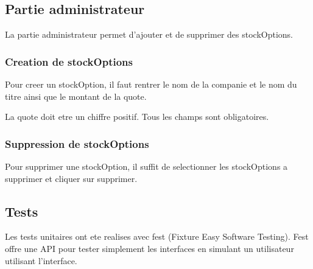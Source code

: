\subsection{Partie administrateur}
La partie administrateur permet d'ajouter et de supprimer des stockOptions.
\subsubsection{Creation de stockOptions}
Pour creer un stockOption, il faut rentrer le nom de la companie et le nom du titre ainsi que le montant de la quote.

La quote doit etre un chiffre positif. Tous les champs sont obligatoires.
\subsubsection{Suppression de stockOptions}
Pour supprimer une stockOption, il suffit de selectionner les stockOptions a supprimer et cliquer sur supprimer.
\subsection{Tests}
Les tests unitaires ont ete realises avec fest (Fixture Easy Software Testing). Fest offre une API pour tester simplement les interfaces en simulant un utilisateur utilisant l'interface.
